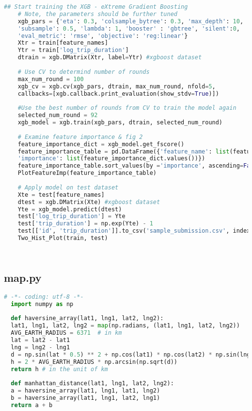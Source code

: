 \documentclass[12pt,report]{ucdavisthesis}
\begin{document}
\begin{lstlisting}[language=Python, caption=code1]
    ## Start training the XGB - eXtreme Gradient Boosting
    # Note, the parameters should be further tuned
    xgb_pars = {'eta': 0.3, 'colsample_bytree': 0.3, 'max_depth': 10,
    'subsample': 0.5, 'lambda': 1, 'booster' : 'gbtree', 'silent':0,
    'eval_metric': 'rmse', 'objective': 'reg:linear'}
    Xtr = train[feature_names]
    Ytr = train['log_trip_duration']
    dtrain = xgb.DMatrix(Xtr, label=Ytr) #xgboost dataset
    
    # Use CV to determind number of rounds
    max_num_round = 100
    xgb_cv = xgb.cv(xgb_pars, dtrain, max_num_round, nfold=5,
    callbacks=[xgb.callback.print_evaluation(show_stdv=True)])
    
    #Use the best number of rounds from CV to train the model again
    selected_num_round = 92
    xgb_model = xgb.train(xgb_pars, dtrain, selected_num_round)
    
    # Examine feature importance & fig 2
    feature_importance_dict = xgb_model.get_fscore()
    feature_importance_table = pd.DataFrame({'feature_name': list(feature_importance_dict.keys()), 
    'importance': list(feature_importance_dict.values())})
    feature_importance_table.sort_values(by ='importance', ascending=False, inplace= True)
    PlotFeatureImp(feature_importance_table)
    
    # Apply model on test dataset
    Xte = test[feature_names]
    dtest = xgb.DMatrix(Xte) #xgboost dataset
    Yte = xgb_model.predict(dtest)
    test['log_trip_duration'] = Yte
    test['trip_duration'] = np.exp(Yte) - 1
    test[['id', 'trip_duration']].to_csv('sample_submission.csv', index=False)
    Two_Hist_Plot(train, test)
    
    
 \end{lstlisting}
 \newpage
 \subsection{map.py}
 \begin{lstlisting}[language=Python, caption=code2]
  # -*- coding: utf-8 -*-
  import numpy as np
  
  def haversine_array(lat1, lng1, lat2, lng2):
  lat1, lng1, lat2, lng2 = map(np.radians, (lat1, lng1, lat2, lng2))
  AVG_EARTH_RADIUS = 6371  # in km
  lat = lat2 - lat1
  lng = lng2 - lng1
  d = np.sin(lat * 0.5) ** 2 + np.cos(lat1) * np.cos(lat2) * np.sin(lng * 0.5) ** 2
  h = 2 * AVG_EARTH_RADIUS * np.arcsin(np.sqrt(d))
  return h # in the unit of km
  
  def manhattan_distance(lat1, lng1, lat2, lng2):
  a = haversine_array(lat1, lng1, lat1, lng2)
  b = haversine_array(lat1, lng1, lat2, lng1)
  return a + b
 \end{lstlisting}
 \newpage
\end{document}
